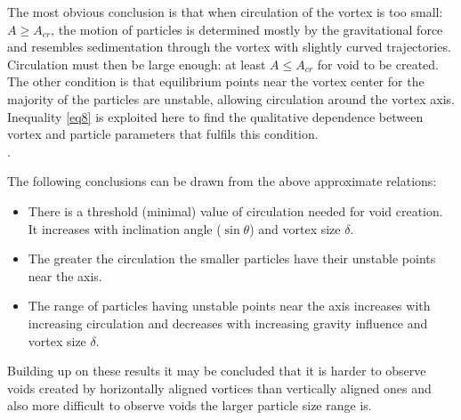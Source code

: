 \documentclass[../main.tex]{subfiles}
\begin{document}
The most obvious conclusion is that when circulation of the vortex is too small: $A \geq A_{cr}$,  the motion of particles is determined mostly by the gravitational force and resembles sedimentation through the vortex with slightly curved trajectories. Circulation must then be large enough: at least $A \leq A_{cr}$ for void to be created.\\
The other condition is that equilibrium points near the vortex center for the majority of the particles are unstable, allowing circulation around the vortex axis. Inequality \ref{eq8} is exploited here to find the qualitative dependence between vortex and particle parameters that fulfils this condition.\\
.

\noindent The following conclusions can be drawn from the above approximate relations:

\begin{itemize}
\item There is a threshold (minimal) value of circulation needed for void creation. It increases with inclination angle ($\sin \theta$) and vortex size $\delta$.
\item The greater the circulation the smaller particles  have their unstable points near the axis.
\item The range of particles having unstable points near the axis increases with increasing circulation and decreases with increasing gravity influence and vortex size $\delta$.
\end{itemize}

\noindent Building up on these results it may be concluded that it is harder to observe voids created by horizontally aligned vortices than vertically aligned ones and also more difficult to observe voids the larger particle size range is.\\
\end{document}
